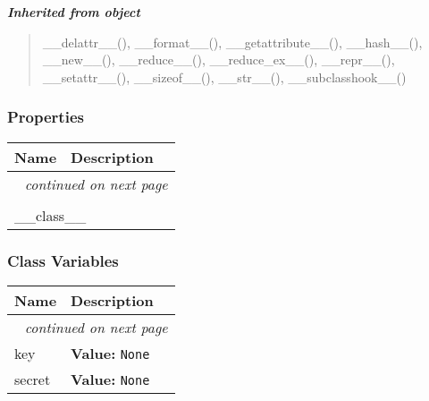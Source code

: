 \large{\textbf{\textit{Inherited from object}}}

\begin{quote}
\_\_delattr\_\_(), \_\_format\_\_(), \_\_getattribute\_\_(), \_\_hash\_\_(), \_\_new\_\_(), \_\_reduce\_\_(), \_\_reduce\_ex\_\_(), \_\_repr\_\_(), \_\_setattr\_\_(), \_\_sizeof\_\_(), \_\_str\_\_(), \_\_subclasshook\_\_()
\end{quote}


  \subsubsection{Properties}

    \vspace{-1cm}
\hspace{\varindent}\begin{longtable}{|p{\varnamewidth}|p{\vardescrwidth}|l}
\cline{1-2}
\cline{1-2} \centering \textbf{Name} & \centering \textbf{Description}& \\
\cline{1-2}
\endhead\cline{1-2}\multicolumn{3}{r}{\small\textit{continued on next page}}\\\endfoot\cline{1-2}
\endlastfoot\multicolumn{2}{|l|}{\textit{Inherited from object}}\\
\multicolumn{2}{|p{\varwidth}|}{\raggedright \_\_class\_\_}\\
\cline{1-2}
\end{longtable}



  \subsubsection{Class Variables}

    \vspace{-1cm}
\hspace{\varindent}\begin{longtable}{|p{\varnamewidth}|p{\vardescrwidth}|l}
\cline{1-2}
\cline{1-2} \centering \textbf{Name} & \centering \textbf{Description}& \\
\cline{1-2}
\endhead\cline{1-2}\multicolumn{3}{r}{\small\textit{continued on next page}}\\\endfoot\cline{1-2}
\endlastfoot\raggedright k\-e\-y\- & \raggedright \textbf{Value:} 
{\tt None}&\\
\cline{1-2}
\raggedright s\-e\-c\-r\-e\-t\- & \raggedright \textbf{Value:} 
{\tt None}&\\
\cline{1-2}
\end{longtable}

